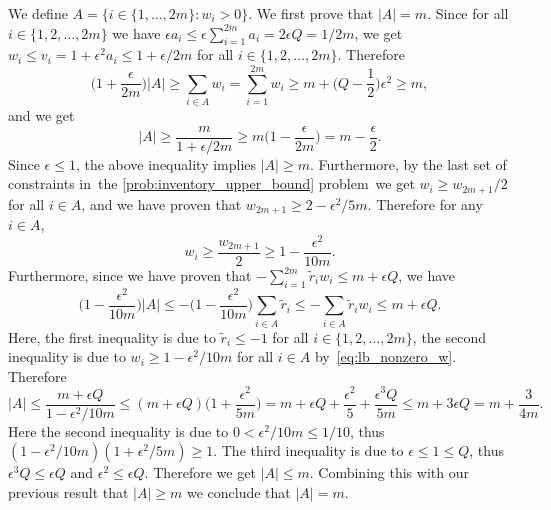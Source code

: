 \documentclass[mnsc,non-blindrev]{informs3}
\theoremstyle{definition}
\begin{document}
\begin{appendices}{\Large{}}
We define $A=\{i\in\{1,\dots,2m\}:w_i>0\}$. We first prove that $|A|=m$. Since for all $i\in\{1,2,\dots,2m\}$ we have $\epsilon a_i\leq \epsilon\sum_{i=1}^{2m}a_i=2\epsilon Q=1/2m$, we get $w_i\leq v_i=1+\epsilon^2 a_i\leq 1+\epsilon/2m$ for all $i\in\{1,2,\dots,2m\}$. Therefore
\begin{equation*}
\Big(1+\dfrac{\epsilon}{2m}\Big)|A|\geq\sum_{i\in A}w_i=\sum_{i=1}^{2m}w_i\geq m+\Big(Q-\dfrac{1}{2}\Big)\epsilon^2\geq m,
\end{equation*}
and we get
\begin{equation*}
|A|\geq \dfrac{m}{1+\epsilon/2m}\geq m\Big(1-\dfrac{\epsilon}{2m}\Big)=m-\dfrac{\epsilon}{2}.
\end{equation*}
Since $\epsilon\leq 1$, the above inequality implies $|A|\geq m$. Furthermore, by the last set of constraints in~the \ref{prob:inventory_upper_bound} problem~we get $w_{i}\geq w_{2m+1}/2$ for all $i\in A$, and we have proven that $w_{2m+1}\geq 2-\epsilon^2/5m$. Therefore for any $i\in A$,
\begin{equation}\label{eq:lb_nonzero_w}
w_i\geq \dfrac{w_{2m+1}}{2}\geq 1-\dfrac{\epsilon^2}{10m}.
\end{equation}
Furthermore, since we have proven that $-\sum_{i=1}^{2m}\tilde{r}_iw_i\leq m+\epsilon Q$, we have
\begin{equation*}
\Big(1-\dfrac{\epsilon^2}{10m}\Big)|A|\leq -\Big(1-\dfrac{\epsilon^2}{10m}\Big)\sum_{i\in A}\tilde{r}_i\leq -\sum_{i\in A}\tilde{r}_iw_i\leq m+\epsilon Q.
\end{equation*}
Here, the first inequality is due to $\tilde{r}_i\leq -1$ for all $i\in\{1,2,\dots,2m\}$, the second inequality is due to $w_i\geq 1-\epsilon^2/10m$ for all $i\in A$ by~\eqref{eq:lb_nonzero_w}. Therefore
\begin{equation*}
|A|\leq\dfrac{m+\epsilon Q}{1-\epsilon^2/10m}\leq (m+\epsilon Q)\Big(1+\dfrac{\epsilon^2}{5m}\Big)=m+\epsilon Q+\dfrac{\epsilon^2}{5}+\dfrac{\epsilon^3Q}{5m}\leq m+3\epsilon Q=m+\dfrac{3}{4m}.
\end{equation*}
Here the second inequality is due to $0<\epsilon^2/10m\leq 1/10$, thus $(1-\epsilon^2/10m)(1+\epsilon^2/5m)\geq 1$. The third inequality is due to $\epsilon\leq 1\leq Q$, thus $\epsilon^3 Q\leq \epsilon Q$ and $\epsilon^2\leq \epsilon Q$. Therefore we get $|A|\leq m$. Combining this with our previous result that $|A|\geq m$ we conclude that $|A|=m$.


\end{appendices}
\end{document}
